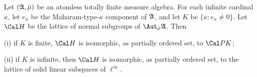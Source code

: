 
 Let $(\frak A,\bar\mu)$ be an atomless
totally finite measure algebra.   For each infinite cardinal $\kappa$,
let $e_{\kappa}$ be the Maharam-type-$\kappa$ component of $\frak A$,
and let $K$ be $\{\kappa:e_{\kappa}\ne 0\}$.   Let $\Cal H$ be the
lattice of normal subgroups of $\AmuA$.   Then

(i) if $K$ is finite, $\Cal H$ is isomorphic, as partially ordered set,
to $\Cal PK$;

(ii) if $K$ is infinite, then $\Cal H$ is isomorphic, as partially
ordered set, to the lattice of solid linear subspaces of
$\ell^{\infty}$.

